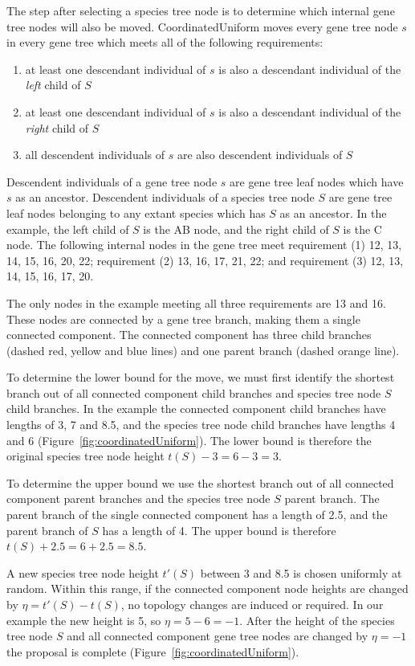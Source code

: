 \documentclass[12pt]{article}
\begin{document}
The step after selecting a species tree node is to determine which internal
gene tree nodes will also be moved. CoordinatedUniform moves every gene tree
node $s$ in every gene tree which meets all of the following requirements:

\begin{enumerate}
\item at least one descendant individual of $s$ is also a
descendant individual of the \textit{left} child of $S$
\item at least one descendant individual of $s$ is also a
descendant individual of the \textit{right} child of $S$
\item all descendent individuals of $s$ are also
descendent individuals of $S$
\end{enumerate}

Descendent individuals of a gene tree node $s$ are gene tree leaf nodes which
have $s$ as an ancestor. Descendent individuals of a species tree node $S$ are
gene tree leaf nodes belonging to any extant species which has $S$ as an
ancestor. In the example, the left child of $S$ is the AB node, and the right
child of $S$ is the C node. The following internal nodes in the gene tree meet
requirement (1) 12, 13, 14, 15, 16, 20, 22; requirement (2) 13, 16, 17, 21,
22; and requirement (3) 12, 13, 14, 15, 16, 17, 20.

The only nodes in the example meeting all three requirements are 13 and 16.
These nodes are connected by a gene tree branch, making them a single
connected component. The connected component has three child branches (dashed
red, yellow and blue lines) and one parent branch (dashed orange line).

To determine the lower bound for the move, we must first identify the shortest
branch out of all connected component child branches and species tree node $S$
child branches. In the example the connected component child branches have
lengths of 3, 7 and 8.5, and the species tree node child branches have lengths 4
and 6 (Figure~\ref{fig:coordinatedUniform}). The lower bound is therefore the
original species tree node height $t(S) - 3 = 6 - 3 = 3$.

To determine the upper bound we use the shortest branch out of all connected
component parent branches and the species tree node $S$ parent branch. The
parent branch of the single connected component has a length of 2.5, and
the parent branch of $S$ has a length of 4. The upper bound is therefore
$t(S) + 2.5 = 6 + 2.5 = 8.5$.

A new species tree node height $t'(S)$ between 3 and 8.5 is chosen uniformly
at random. Within this range, if the connected component node heights are
changed by $\eta = t'(S) - t(S)$, no topology changes are induced or required.
In our example the new height is 5, so $\eta = 5 - 6 = -1$. After the
height of the species tree node $S$ and all connected component gene tree
nodes are changed by $\eta = -1$ the proposal is complete
(Figure~\ref{fig:coordinatedUniform}).
\end{document}
